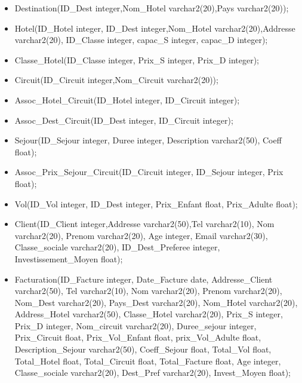 \begin{itemize}
\item Destination(ID\_Dest integer,Nom\_Hotel varchar2(20),Pays varchar2(20));\\
\item Hotel(ID\_Hotel integer, ID\_Dest integer,Nom\_Hotel varchar2(20),Addresse varchar2(20), ID\_Classe integer, capac\_S integer, capac\_D integer);\\
\item Classe\_Hotel(ID\_Classe integer, Prix\_S integer, Prix\_D integer);\\
\item Circuit(ID\_Circuit integer,Nom\_Circuit varchar2(20));\\
\item Assoc\_Hotel\_Circuit(ID\_Hotel integer, ID\_Circuit integer);\\
\item Assoc\_Dest\_Circuit(ID\_Dest integer, ID\_Circuit integer);\\
\item Sejour(ID\_Sejour integer, Duree integer, Description varchar2(50), Coeff float);\\
\item Assoc\_Prix\_Sejour\_Circuit(ID\_Circuit integer, ID\_Sejour integer, Prix float);\\
\item Vol(ID\_Vol integer, ID\_Dest integer, Prix\_Enfant float, Prix\_Adulte float);\\
\item Client(ID\_Client integer,Addresse varchar2(50),Tel varchar2(10), Nom varchar2(20), Prenom varchar2(20), Age integer, Email varchar2(30), Classe\_sociale varchar2(20), ID\_Dest\_Preferee integer, Investissement\_Moyen float);\\

\item Facturation(ID\_Facture integer, Date\_Facture date, Addresse\_Client varchar2(50), Tel varchar2(10), Nom varchar2(20), Prenom varchar2(20), Nom\_Dest varchar2(20), Pays\_Dest varchar2(20), Nom\_Hotel varchar2(20), Address\_Hotel varchar2(50), Classe\_Hotel varchar2(20), Prix\_S integer, Prix\_D integer, Nom\_circuit varchar2(20), Duree\_sejour integer, Prix\_Circuit float, Prix\_Vol\_Enfant float, prix\_Vol\_Adulte float, Description\_Sejour varchar2(50), Coeff\_Sejour float, Total\_Vol float, Total\_Hotel float,  Total\_Circuit float, Total\_Facture float, Age integer, Classe\_sociale varchar2(20), Dest\_Pref varchar2(20), Invest\_Moyen float);\\
\end{itemize}

